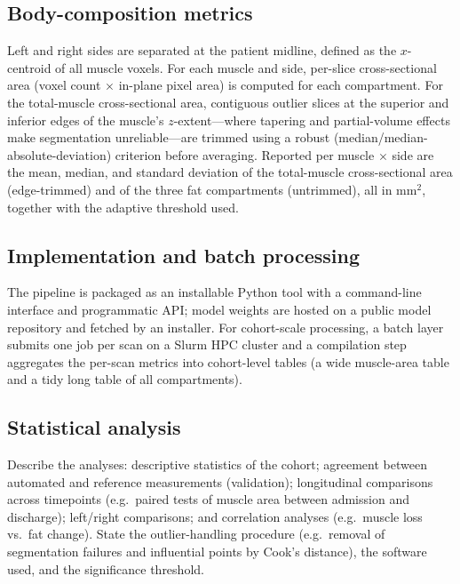 \documentclass{article}
\begin{document}
\subsection{Body-composition metrics}
Left and right sides are separated at the patient midline, defined as the
$x$-centroid of all muscle voxels. For each muscle and side, per-slice
cross-sectional area (voxel count $\times$ in-plane pixel area) is computed for
each compartment. For the total-muscle cross-sectional area, contiguous outlier
slices at the superior and inferior edges of the muscle's $z$-extent---where
tapering and partial-volume effects make segmentation unreliable---are trimmed
using a robust (median/median-absolute-deviation) criterion before averaging.
Reported per muscle $\times$ side are the mean, median, and standard deviation of
the total-muscle cross-sectional area (edge-trimmed) and of the three fat
compartments (untrimmed), all in mm$^2$, together with the
adaptive threshold used.

\subsection{Implementation and batch processing}
The pipeline is packaged as an installable Python tool with a command-line
interface and programmatic API; model weights are hosted on a public model
repository and fetched by an installer. For cohort-scale processing, a batch
layer submits one job per scan on a Slurm HPC cluster and a compilation step
aggregates the per-scan metrics into cohort-level tables (a wide muscle-area
table and a tidy long table of all compartments).

\subsection{Statistical analysis}
Describe the analyses: descriptive statistics of the cohort; agreement between
automated and reference measurements (validation); longitudinal comparisons
across timepoints (e.g.\ paired tests of muscle area between admission and
discharge); left/right comparisons; and correlation analyses (e.g.\ muscle loss
vs.\ fat change). State the outlier-handling procedure (e.g.\ removal of
segmentation failures and influential points by Cook's distance), the software
used, and the significance threshold.

\end{document}
